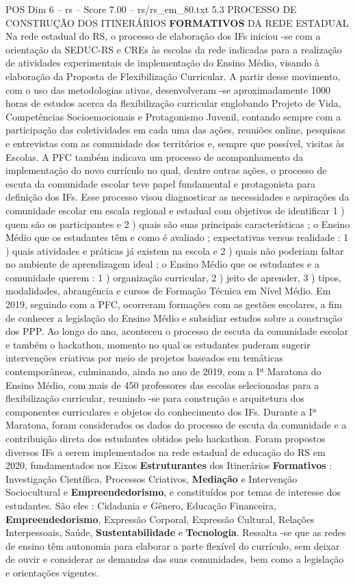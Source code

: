 \begin{textsample}{POS Dim 6 – rs – Score 7.00 – rs/rs\_em\_80.txt}  \label{ex:f6_pos_190}
5.3 PROCESSO DE CONSTRUÇÃO DOS ITINERÁRIOS \textbf{FORMATIVOS} DA REDE ESTADUAL Na rede estadual do RS, o processo de elaboração dos IFs iniciou -se com a orientação da SEDUC-RS e CREs às escolas da rede indicadas para a realização de atividades experimentais de implementação do Ensino Médio, visando à elaboração da Proposta de Flexibilização Curricular.
A partir desse movimento, com o uso das metodologias ativas, desenvolveram -se aproximadamente 1000 horas de estudos acerca da flexibilização curricular englobando Projeto de Vida, Competências Socioemocionais e Protagonismo Juvenil, contando sempre com a participação das coletividades em cada uma das ações, reuniões online, pesquisas e entrevistas com as comunidade dos territórios e, sempre que possível, visitas às Escolas.
A PFC também indicava um processo de acompanhamento da implementação do novo currículo no qual, dentre outras ações, o processo de escuta da comunidade escolar teve papel fundamental e protagonista para definição dos IFs.
Esse processo visou diagnosticar as necessidades e aspirações da comunidade escolar em escala regional e estadual com objetivos de identificar 1 ) quem são os participantes e 2 ) quais são suas principais características ; o Ensino Médio que os estudantes têm e como é avaliado ; expectativas versus realidade : 1 ) quais atividades e práticas já existem na escola e 2 ) quais não poderiam faltar no ambiente de aprendizagem ideal ; o Ensino Médio que os estudantes e a comunidade querem : 1 ) organização curricular, 2 ) jeito de aprender, 3 ) tipos, modalidades, abrangência e cursos de Formação Técnica em Nível Médio.
Em 2019, seguindo com a PFC, ocorreram formações com as gestões escolares, a fim de conhecer a legislação do Ensino Médio e subsidiar estudos sobre a construção dos PPP.
Ao longo do ano, aconteceu o processo de escuta da comunidade escolar e também o hackathon, momento no qual os estudantes puderam sugerir intervenções criativas por meio de projetos baseados em temáticas contemporâneas, culminando, ainda no ano de 2019, com a Iª Maratona do Ensino Médio, com mais de 450 professores das escolas selecionadas para a flexibilização curricular, reunindo -se para construção e arquitetura dos componentes curriculares e objetos do conhecimento dos IFs.
Durante a Iª Maratona, foram considerados os dados do processo de escuta da comunidade e a contribuição direta dos estudantes obtidos pelo hackathon.
Foram propostos diversos IFs a serem implementados na rede estadual de educação do RS em 2020, fundamentados nos Eixos \textbf{Estruturantes} dos Itinerários \textbf{Formativos} : Investigação Científica, Processos Criativos, \textbf{Mediação} e Intervenção Sociocultural e \textbf{Empreendedorismo}, e constituídos por temas de interesse dos estudantes.
São eles : Cidadania e Gênero, Educação Financeira, \textbf{Empreendedorismo}, Expressão Corporal, Expressão Cultural, Relações Interpessoais, Saúde, \textbf{Sustentabilidade} e \textbf{Tecnologia}.
Ressalta -se que as redes de ensino têm autonomia para elaborar a parte flexível do currículo, sem deixar de ouvir e considerar as demandas das suas comunidades, bem como a legislação e orientações vigentes.

\end{textsample}
